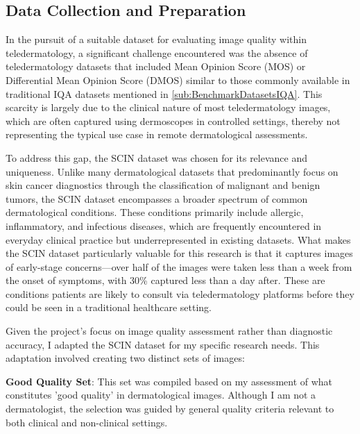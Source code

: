 \subsection{Data Collection and Preparation}
\label{sub:DataCollection}
In the pursuit of a suitable dataset for evaluating image quality within teledermatology, a significant challenge encountered was the absence of teledermatology datasets that included Mean Opinion Score (MOS) or Differential Mean Opinion Score (DMOS) similar to those commonly available in traditional IQA datasets mentioned in \autoref{sub:BenchmarkDatasetsIQA}. This scarcity is largely due to the clinical nature of most teledermatology images, which are often captured using dermoscopes in controlled settings, thereby not representing the typical use case in remote dermatological assessments.\par
\vspace{\baselineskip}
\noindent
To address this gap, the SCIN dataset was chosen for its relevance and uniqueness. Unlike many dermatological datasets that predominantly focus on skin cancer diagnostics through the classification of malignant and benign tumors, the SCIN dataset encompasses a broader spectrum of common dermatological conditions. These conditions primarily include allergic, inflammatory, and infectious diseases, which are frequently encountered in everyday clinical practice but underrepresented in existing datasets. What makes the SCIN dataset particularly valuable for this research is that it captures images of early-stage concerns—over half of the images were taken less than a week from the onset of symptoms, with 30\% captured less than a day after. These are conditions patients are likely to consult via teledermatology platforms before they could be seen in a traditional healthcare setting.\par
\vspace{\baselineskip}
\noindent
Given the project's focus on image quality assessment rather than diagnostic accuracy, I adapted the SCIN dataset for my specific research needs. This adaptation involved creating two distinct sets of images:\par
\vspace{\baselineskip}
\noindent
\textbf{Good Quality Set}: This set was compiled based on my assessment of what constitutes 'good quality' in dermatological images. Although I am not a dermatologist, the selection was guided by general quality criteria relevant to both clinical and non-clinical settings. \par
